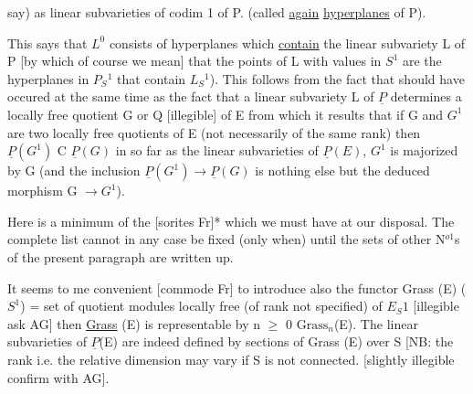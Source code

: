 
say) as linear subvarieties of codim 1 of P.  (called \uline{again}
\uline{hyperplanes} of P).

This says that $L^0$ consists of hyperplanes which \uline{contain} the
linear subvariety L of P [by which of course we mean] that the
points of L with values in $S^1$ are the hyperplanes in $P_S{}^1$ that
contain $L_S{}^1$).  This follows from the fact that should have occured
at the same time as the fact that a linear subvariety L of $\underline{P}$
determines a locally free quotient G or Q [illegible] of E from
which it results that if G and $G^1$ are two locally free quotients of
E (not necessarily of the same rank) then $\underline{P}(G^1)$ C $\underline{P}(G)$ in so far as
the linear subvarieties of $\underline{P}(E)$, $G^1$ is majorized by G (and the
inclusion $\underline{P}(G^1) \rightarrow \underline{P}(G)$ is nothing else but the deduced morphism G
$\rightarrow G^1$).

Here is a minimum of the [sorites Fr]* which we must have at
our disposal.  The complete list cannot in any case be fixed (only
when) until the sets of other N$^{o1}$s of the present paragraph are
written up.

It seems to me convenient [commode Fr] to introduce also the
functor Grass (E) ($S^1$) = set of quotient modules locally free (of
rank not specified) of $E_S1$ [illegible ask AG]
then \uline{Grass} (E) is representable by n $\geq$ 0 $\mathrm{Grass}_n$(E).  The linear
subvarieties of $\underline{P}$(E) are indeed defined by sections of Grass (E)
over S [NB:  the rank i.e. the relative dimension may vary if S is
not connected.  [slightly illegible confirm with AG].

